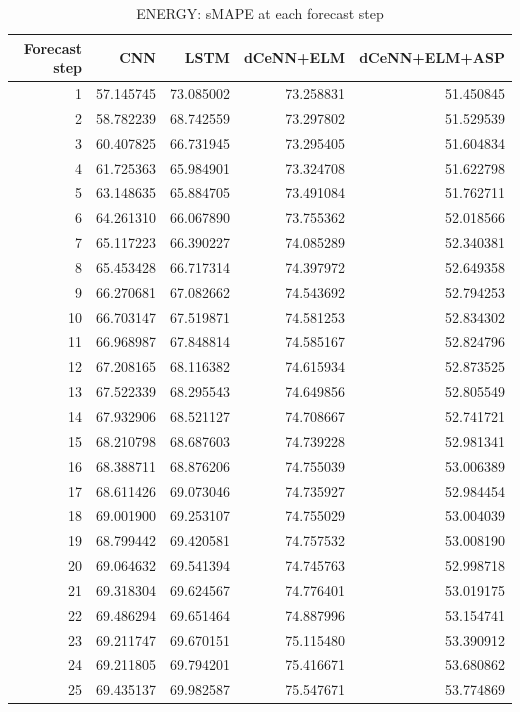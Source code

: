 \begin{table}
\caption{ENERGY: sMAPE at each forecast step}
\begin{tabular}{rrrrr}
\toprule
Forecast step & CNN & LSTM & dCeNN+ELM & dCeNN+ELM+ASP \\
\midrule
1 & 57.145745 & 73.085002 & 73.258831 & 51.450845 \\
2 & 58.782239 & 68.742559 & 73.297802 & 51.529539 \\
3 & 60.407825 & 66.731945 & 73.295405 & 51.604834 \\
4 & 61.725363 & 65.984901 & 73.324708 & 51.622798 \\
5 & 63.148635 & 65.884705 & 73.491084 & 51.762711 \\
6 & 64.261310 & 66.067890 & 73.755362 & 52.018566 \\
7 & 65.117223 & 66.390227 & 74.085289 & 52.340381 \\
8 & 65.453428 & 66.717314 & 74.397972 & 52.649358 \\
9 & 66.270681 & 67.082662 & 74.543692 & 52.794253 \\
10 & 66.703147 & 67.519871 & 74.581253 & 52.834302 \\
11 & 66.968987 & 67.848814 & 74.585167 & 52.824796 \\
12 & 67.208165 & 68.116382 & 74.615934 & 52.873525 \\
13 & 67.522339 & 68.295543 & 74.649856 & 52.805549 \\
14 & 67.932906 & 68.521127 & 74.708667 & 52.741721 \\
15 & 68.210798 & 68.687603 & 74.739228 & 52.981341 \\
16 & 68.388711 & 68.876206 & 74.755039 & 53.006389 \\
17 & 68.611426 & 69.073046 & 74.735927 & 52.984454 \\
18 & 69.001900 & 69.253107 & 74.755029 & 53.004039 \\
19 & 68.799442 & 69.420581 & 74.757532 & 53.008190 \\
20 & 69.064632 & 69.541394 & 74.745763 & 52.998718 \\
21 & 69.318304 & 69.624567 & 74.776401 & 53.019175 \\
22 & 69.486294 & 69.651464 & 74.887996 & 53.154741 \\
23 & 69.211747 & 69.670151 & 75.115480 & 53.390912 \\
24 & 69.211805 & 69.794201 & 75.416671 & 53.680862 \\
25 & 69.435137 & 69.982587 & 75.547671 & 53.774869 \\

\end{tabular}
\end{table}
